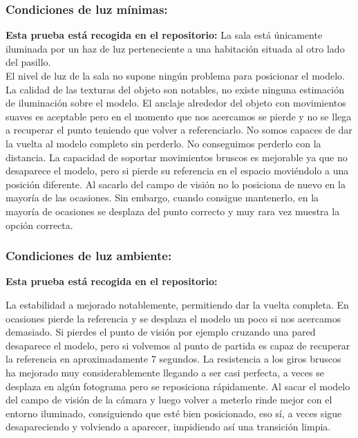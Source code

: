 \subsubsection{Condiciones de luz mínimas:}
\textbf{Esta prueba está recogida en el repositorio:}
La sala está únicamente iluminada por un haz de luz perteneciente a una habitación situada al otro lado del pasillo.\\

El nivel de luz de la sala no supone ningún problema para posicionar el modelo. La calidad de las texturas del objeto son notables, no existe ninguna estimación de iluminación sobre el modelo. El anclaje alrededor del objeto con movimientos suaves es aceptable pero en el momento que nos acercamos se pierde y no se llega a recuperar el punto teniendo que volver a referenciarlo.  No somos capaces de dar la vuelta al modelo completo sin perderlo. No conseguimos perderlo con la distancia. La capacidad de soportar movimientos bruscos es mejorable ya que no desaparece el modelo, pero si pierde su referencia en el espacio moviéndolo a una posición diferente. Al sacarlo del campo de visión no lo posiciona de nuevo en la mayoría de las ocasiones. Sin embargo, cuando consigue mantenerlo, en la mayoría de ocasiones se desplaza del punto correcto y muy rara vez muestra la opción correcta.

\subsubsection{Condiciones de luz ambiente:}

\textbf{Esta prueba está recogida en el repositorio:}

La estabilidad a mejorado notablemente, permitiendo dar la vuelta completa. En ocasiones pierde la referencia y se desplaza el modelo un poco si nos acercamos demasiado. Si pierdes el punto de visión por ejemplo cruzando una pared desaparece el modelo, pero si volvemos al punto de partida es capaz de recuperar la referencia en aproximadamente 7 segundos. La resistencia a los giros bruscos ha mejorado muy considerablemente llegando a ser casi perfecta, a veces se desplaza en algún fotograma pero se reposiciona rápidamente. Al sacar el modelo del campo de visión de la cámara y luego volver a meterlo rinde mejor con el entorno iluminado, consiguiendo que esté bien posicionado, eso sí, a veces sigue desapareciendo y volviendo a aparecer, impidiendo así una transición limpia.

